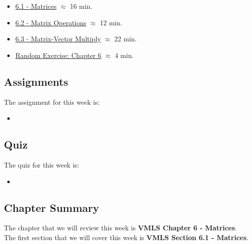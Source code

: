 \begin{itemize}
    \item \href{https://applied.cs.colorado.edu/mod/hvp/view.php?id=50733}{6.1 - Matrices} $\approx$ 16 min.
    \item \href{https://applied.cs.colorado.edu/mod/hvp/view.php?id=50734}{6.2 - Matrix Operations} $\approx$ 12 min.
    \item \href{https://applied.cs.colorado.edu/mod/hvp/view.php?id=50735}{6.3 - Matrix-Vector Multiply} $\approx$ 22 min.
    \item \href{https://applied.cs.colorado.edu/mod/hvp/view.php?id=50736}{Random Exercise: Chapter 6} $\approx$ 4 min.
\end{itemize}

\subsection{Assignments}

The assignment for this week is:

\begin{itemize}
    \item {}
\end{itemize}

\subsection{Quiz}

The quiz for this week is:

\begin{itemize}
    \item {}
\end{itemize}

\newpage

\subsection{Chapter Summary}

The chapter that we will review this week is \textbf{VMLS Chapter 6 - Matrices}. The first section that we will cover this week is \textbf{VMLS Section 6.1 - Matrices}.

